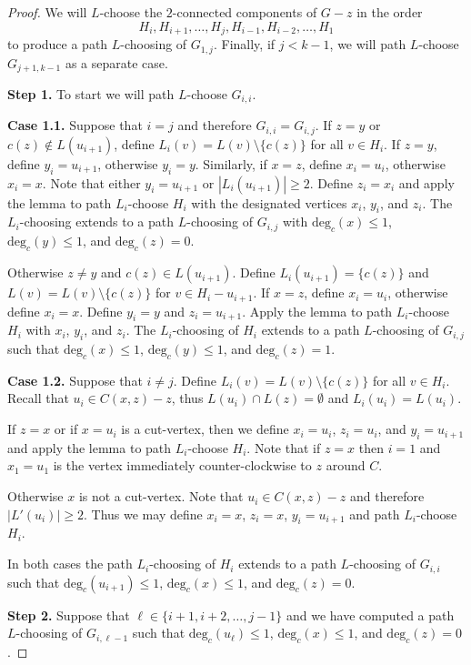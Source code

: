 \documentclass[12pt,letterpaper]{article}
\theoremstyle{plain}
\theoremstyle{definition}
\theoremstyle{break}
\begin{document}
\begin{proof}
We will $L$-choose the $2$-connected components of $G-z$ in the order
$$H_i,H_{i+1},\ldots,H_j,H_{i-1},H_{i-2},\ldots,H_1$$
to produce a path $L$-choosing of $G_{1,j}$. Finally,
if $j < k-1$, we will
path $L$-choose $G_{j+1,k-1}$ as a separate case.

\textbf{Step 1.} To start we will path $L$-choose $G_{i,i}$.

\textbf{Case 1.1.} Suppose that $i=j$ and therefore
$G_{i,i}=G_{i,j}$. If $z=y$ or $c(z)\not\in L(u_{i+1})$,
define $L_i(v)=L(v)\setminus\{c(z)\}$
for all $v\in H_i$. If $z=y$, define
$y_i=u_{i+1}$, otherwise $y_i=y$. Similarly, if $x=z$, define $x_i=u_i$,
otherwise $x_i=x$. Note that either $y_i=u_{i+1}$ or $|L_i(u_{i+1})|\ge 2$.
Define $z_i=x_i$ and apply the lemma to path
$L_i$-choose $H_i$ with the designated vertices $x_i$, $y_i$, and $z_i$.
The $L_i$-choosing
extends to a path $L$-choosing of $G_{i,j}$ with
$\text{deg}_c(x)\le 1$, $\text{deg}_c(y)\le 1$, and $\text{deg}_c(z)=0$.

Otherwise $z\ne y$ and $c(z)\in L(u_{i+1})$. Define
$L_i(u_{i+1})=\{c(z)\}$ and $L(v)=L(v)\setminus\{c(z)\}$ for
$v\in H_i-u_{i+1}$. If $x=z$, define $x_i=u_i$, otherwise define $x_i=x$.
Define $y_i=y$ and $z_i=u_{i+1}$.
Apply the lemma to path $L_i$-choose $H_i$ with
$x_i$, $y_i$, and $z_i$. The $L_i$-choosing of $H_i$ extends to a path
$L$-choosing of $G_{i,j}$ such that $\text{deg}_c(x)\le 1$,
$\text{deg}_c(y)\le 1$, and $\text{deg}_c(z)=1$.

\textbf{Case 1.2.} Suppose that $i\ne j$.
Define $L_i(v)=L(v)\setminus\{c(z)\}$ for all $v\in H_i$. Recall that
$u_i\in C(x,z)-z$, thus $L(u_i)\cap L(z)=\emptyset$ and $L_i(u_i)=L(u_i)$. 

If $z=x$ or if $x=u_i$ is a cut-vertex, then we
define $x_i=u_i$, $z_i=u_i$, and $y_i=u_{i+1}$ and apply the lemma
to path $L_i$-choose $H_i$. Note that if $z=x$ then $i=1$ and $x_1=u_1$
is the vertex immediately counter-clockwise to $z$ around $C$.

Otherwise $x$ is not a cut-vertex. Note that $u_i\in C(x,z) - z$ and
therefore $|L'(u_i)|\ge 2$. Thus we may define $x_i=x$, $z_i=x$,
$y_i=u_{i+1}$ and path $L_i$-choose $H_i$.

In both cases the path $L_i$-choosing of $H_i$ extends to a path
$L$-choosing of $G_{i,i}$ such that $\text{deg}_c(u_{i+1})\le 1$,
$\text{deg}_c(x)\le 1$, and $\text{deg}_c(z)=0$.

\textbf{Step 2.} Suppose that $\ell\in\{i+1, i+2,\ldots,j-1\}$
and we have computed a path $L$-choosing of $G_{i,\ell-1}$ such that
$\text{deg}_c(u_\ell)\le1$, $\text{deg}_c(x)\le 1$,
and $\text{deg}_c(z)=0$.


\end{proof}
\end{document}

